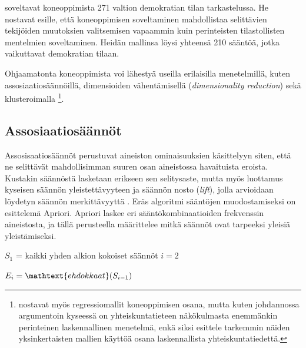 \documentclass[finnish,gradu,twoside,12pt]{tktltiki}
\begin{document}
{\citet{Jurek2013} soveltavat koneoppimista 271 valtion demokratian tilan tarkastelussa. He nostavat esille, että koneoppimisen soveltaminen mahdollistaa selittävien tekijöiden muutoksien valitsemisen vapaammin kuin perinteisten tilastollisten mentelmien soveltaminen. Heidän mallinsa löysi yhteensä 210 sääntöä, jotka vaikuttavat demokratian tilaan.


\cite{collingwood12}



Ohjaamatonta koneoppimista voi lähestyä useilla erilaisilla menetelmillä, kuten assosiaatiosäännöillä, dimensioiden vähentämisellä (\textit{dimensionality reduction}) sekä  klusteroimalla \citet[485--586]{Hastie2009}\footnote{\citet[43--138]{Hastie2009} nostavat myös regressiomallit koneoppimisen osana, mutta kuten johdannossa argumentoin kyseessä on yhteiskuntatieteen näkökulmasta enemmänkin perinteinen laskennallinen menetelmä, enkä siksi esittele tarkemmin näiden yksinkertaisten mallien käyttöä osana laskennallista yhteiskuntatiedettä.}. 

\subsection{Assosiaatiosäännöt}

Assosisaatiosäännöt perustuvat aineiston ominaisuuksien käsittelyyn siten, että ne selittävät mahdollisimman suuren osan aineistossa havaituista eroista. Kustakin säännöstä lasketaan erikseen sen selitysaste, mutta myös luottamus kyseisen säännön yleistettävyyteen ja säännön nosto (\textit{lift}), jolla arvioidaan löydetyn säännön merkittävyyttä \citep[485--586]{Hastie2009}. Eräs algoritmi sääntöjen muodostamiseksi on \citet{Agrawal1994a} esittelemä Apriori. Apriori laskee eri sääntökombinaatioiden frekvenssin aineistosta, ja tällä perusteella määrittelee mitkä säännöt ovat tarpeeksi yleisiä yleistämiseksi. 

\begin{algorithm}
\State $S_1$ = {kaikki yhden alkion kokoiset säännöt}
\State $i = 2$

  \State $E_i = \mathtext{ehdokkaat}(S_{i-1}) $


\end{algorithm}}
\end{document}
